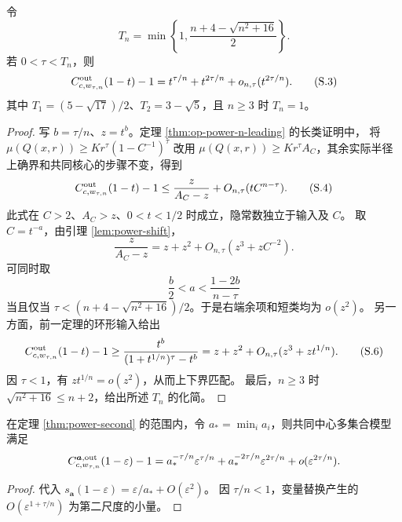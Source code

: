 \begin{theorem}[统一二阶端点]\label{thm:power-second}
令
\[T_n=\min\left\{1,\frac{n+4-\sqrt{n^2+16}}2\right\}.
\]
若 $0<\tau<T_n$，则
\[C^{\rm out}_{c,w_{\tau,n}}(1-t)-1
=t^{\tau/n}+t^{2\tau/n}+o_{n,\tau}(t^{2\tau/n}).\tag{S.3}\]
其中 $T_1=(5-\sqrt{17})/2$、$T_2=3-\sqrt5$，且 $n\ge3$ 时 $T_n=1$。
\end{theorem}
\begin{proof}
写 $b=\tau/n$、$z=t^b$。定理 \ref{thm:op-power-n-leading} 的长类证明中，
将 $\mu(Q(x,r))\ge Kr^\tau(1-C^{-1})^\tau$ 改用
$\mu(Q(x,r))\ge Kr^\tau A_C$，其余实际半径上确界和共同核心的步骤不变，得到
\[C^{\rm out}_{c,w_{\tau,n}}(1-t)-1
\le\frac z{A_C-z}+O_{n,\tau}(tC^{n-\tau}).\tag{S.4}\]
此式在 $C>2$、$A_C>z$、$0<t<1/2$ 时成立，隐常数独立于输入及 $C$。
取 $C=t^{-a}$，由引理 \ref{lem:power-shift}，
\[\frac z{A_C-z}=z+z^2+O_{n,\tau}(z^3+zC^{-2}).\]
可同时取
\[\frac b2<a<\frac{1-2b}{n-\tau}\tag{S.5}\]
当且仅当 $\tau<(n+4-\sqrt{n^2+16})/2$。于是右端余项和短类均为 $o(z^2)$。
另一方面，前一定理的环形输入给出
\[C^{\rm out}_{c,w_{\tau,n}}(1-t)-1
\ge\frac{t^b}{(1+t^{1/n})^\tau-t^b}
=z+z^2+O_{n,\tau}(z^3+zt^{1/n}).\tag{S.6}\]
因 $\tau<1$，有 $zt^{1/n}=o(z^2)$，从而上下界匹配。
最后，$n\ge3$ 时 $\sqrt{n^2+16}\le n+2$，给出所述 $T_n$ 的化简。
\end{proof}
\begin{corollary}
在定理 \ref{thm:power-second} 的范围内，令 $a_*=\min_i a_i$，则共同中心多集合模型满足
\[C^{\boldsymbol a,\rm out}_{c,w_{\tau,n}}(1-\varepsilon)-1
=a_*^{-\tau/n}\varepsilon^{\tau/n}
+a_*^{-2\tau/n}\varepsilon^{2\tau/n}+o(\varepsilon^{2\tau/n}).\]
\end{corollary}
\begin{proof}
代入 $s_{\boldsymbol a}(1-\varepsilon)=\varepsilon/a_*+O(\varepsilon^2)$。
因 $\tau/n<1$，变量替换产生的 $O(\varepsilon^{1+\tau/n})$ 为第二尺度的小量。
\end{proof}
